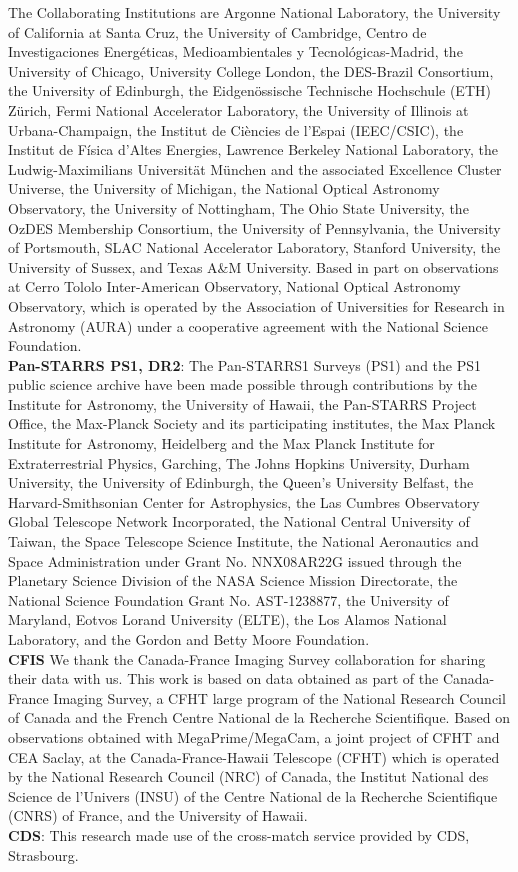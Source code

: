 \documentclass[fleqn,usenatbib]{mnras}
\begin{document}
The Collaborating Institutions are Argonne National Laboratory, the University of California at Santa Cruz, the University of Cambridge, Centro de Investigaciones Energ{\'e}ticas, Medioambientales y Tecnol{\'o}gicas-Madrid, the University of Chicago, University College London, the DES-Brazil Consortium, the University of Edinburgh, the Eidgen{\"o}ssische Technische Hochschule (ETH) Z{\"u}rich,  Fermi National Accelerator Laboratory, the University of Illinois at Urbana-Champaign, the Institut de Ci{\`e}ncies de l'Espai (IEEC/CSIC), the Institut de F{\'i}sica d'Altes Energies, Lawrence Berkeley National Laboratory, the Ludwig-Maximilians Universit{\"a}t M{\"u}nchen and the associated Excellence Cluster Universe, the University of Michigan, the National Optical Astronomy Observatory, the University of Nottingham, The Ohio State University, the OzDES Membership Consortium, the University of Pennsylvania, the University of Portsmouth, SLAC National Accelerator Laboratory, Stanford University, the University of Sussex, and Texas A\&M University.
Based in part on observations at Cerro Tololo Inter-American Observatory, National Optical Astronomy Observatory, which is operated by the Association of Universities for Research in Astronomy (AURA) under a cooperative agreement with the National Science Foundation.\\
{\bf Pan-STARRS PS1, DR2}: The Pan-STARRS1 Surveys (PS1) and the PS1 public science archive have been made possible through contributions by the Institute for Astronomy, the University of Hawaii, the Pan-STARRS Project Office, the Max-Planck Society and its participating institutes, the Max Planck Institute for Astronomy, Heidelberg and the Max Planck Institute for Extraterrestrial Physics, Garching, The Johns Hopkins University, Durham University, the University of Edinburgh, the Queen's University Belfast, the Harvard-Smithsonian Center for Astrophysics, the Las Cumbres Observatory Global Telescope Network Incorporated, the National Central University of Taiwan, the Space Telescope Science Institute, the National Aeronautics and Space Administration under Grant No. NNX08AR22G issued through the Planetary Science Division of the NASA Science Mission Directorate, the National Science Foundation Grant No. AST-1238877, the University of Maryland, Eotvos Lorand University (ELTE), the Los Alamos National Laboratory, and the Gordon and Betty Moore Foundation.\\
{\bf CFIS} We thank the Canada-France Imaging Survey collaboration for sharing their data with us. This work is based on data obtained as part of the Canada-France Imaging Survey, a CFHT large program of the National Research Council of Canada and the French Centre National de la Recherche Scientifique. Based on observations obtained with MegaPrime/MegaCam, a joint project of CFHT and CEA Saclay, at the Canada-France-Hawaii Telescope (CFHT) which is operated by the National Research Council (NRC) of Canada, the Institut National des Science de l'Univers (INSU) of the Centre National de la Recherche Scientifique (CNRS) of France, and the University of Hawaii.\\
{\bf CDS}:  This research made use of the cross-match service provided by CDS, Strasbourg.
\end{document}
